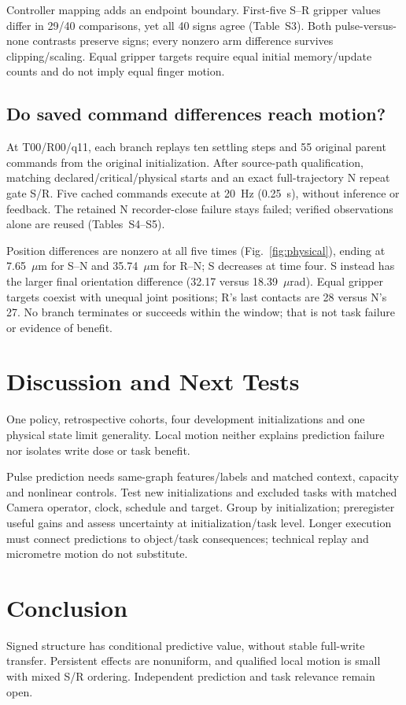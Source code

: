 \documentclass[conference]{IEEEtran}
\begin{document}
Controller mapping adds an endpoint boundary. First-five S--R gripper values differ in 29/40 comparisons, yet all 40 signs agree (Table~S3). Both pulse-versus-none contrasts preserve signs; every nonzero arm difference survives clipping/scaling. Equal gripper targets require equal initial memory/update counts and do not imply equal finger motion.

\subsection{Do saved command differences reach motion?}
At T00/R00/q11, each branch replays ten settling steps and 55 original parent commands from the original initialization. After source-path qualification, matching declared/critical/physical starts and an exact full-trajectory N repeat gate S/R. Five cached commands execute at 20~Hz (0.25~s), without inference or feedback. The retained N recorder-close failure stays failed; verified observations alone are reused (Tables~S4--S5).

Position differences are nonzero at all five times (Fig.~\ref{fig:physical}), ending at 7.65~$\mu$m for S--N and 35.74~$\mu$m for R--N; S decreases at time four. S instead has the larger final orientation difference (32.17 versus 18.39~$\mu$rad). Equal gripper targets coexist with unequal joint positions; R's last contacts are 28 versus N's 27. No branch terminates or succeeds within the window; that is not task failure or evidence of benefit.

\balance
\section{Discussion and Next Tests}
One policy, retrospective cohorts, four development initializations and one physical state limit generality. Local motion neither explains prediction failure nor isolates write dose or task benefit.

Pulse prediction needs same-graph features/labels and matched context, capacity and nonlinear controls. Test new initializations and excluded tasks with matched Camera operator, clock, schedule and target. Group by initialization; preregister useful gains and assess uncertainty at initialization/task level. Longer execution must connect predictions to object/task consequences; technical replay and micrometre motion do not substitute.

\section{Conclusion}
Signed structure has conditional predictive value, without stable full-write transfer. Persistent effects are nonuniform, and qualified local motion is small with mixed S/R ordering. Independent prediction and task relevance remain open.

\clearpage
{}


\end{document}
